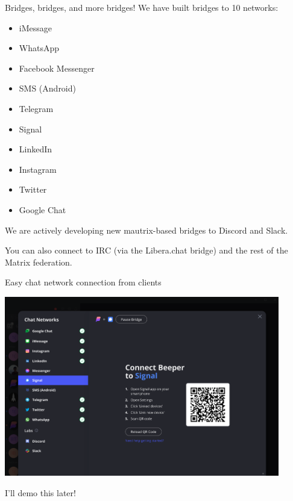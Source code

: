 \documentclass{beeper}
\begin{document}
\begin{frame}{Bridges, bridges, and more bridges!}
    We have built bridges to 10 networks:
    \begin{multicols}{2}
        \begin{itemize}
            \item iMessage
            \item WhatsApp
            \item Facebook Messenger
            \item SMS (Android)
            \item Telegram
            \item Signal
            \item LinkedIn
            \item Instagram
            \item Twitter
            \item Google Chat
        \end{itemize}
    \end{multicols}

    \pause
    We are actively developing new mautrix-based bridges to Discord and Slack.

    \pause
    You can also connect to IRC (via the Libera.chat bridge) and the rest of the
    Matrix federation.
\end{frame}

\begin{frame}{Easy chat network connection from clients}
    \centerline{\includegraphics[width=0.9\textwidth]{images/chat-networks-dialog}}

    I'll demo this later!
\end{frame}
\end{document}
